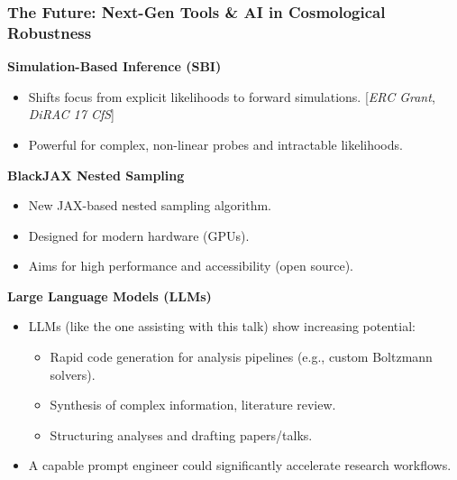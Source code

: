 \documentclass[aspectratio=169]{beamer}
\begin{document}
\begin{frame}
    \frametitle{The Future: Next-Gen Tools & AI in Cosmological Robustness}
        \textbf{Simulation-Based Inference (SBI)}
        \begin{itemize}
            \item Shifts focus from explicit likelihoods to forward simulations. [\textit{ERC Grant}, \textit{DiRAC 17 CfS}]
            \item Powerful for complex, non-linear probes and intractable likelihoods.
        \end{itemize}
        \vspace{1em}
        \textbf{BlackJAX Nested Sampling}
        \begin{itemize}
            \item New JAX-based nested sampling algorithm.
            \item Designed for modern hardware (GPUs).
            \item Aims for high performance and accessibility (open source).
        \end{itemize}
        \vspace{1em}
        \textbf{Large Language Models (LLMs)}
        \begin{itemize}
            \item LLMs (like the one assisting with this talk) show increasing potential:
                \begin{itemize}
                    \item Rapid code generation for analysis pipelines (e.g., custom Boltzmann solvers).
                    \item Synthesis of complex information, literature review.
                    \item Structuring analyses and drafting papers/talks.
                \end{itemize}
            \item A capable prompt engineer could significantly accelerate research workflows.
        \end{itemize}
\end{frame}
\end{document}
